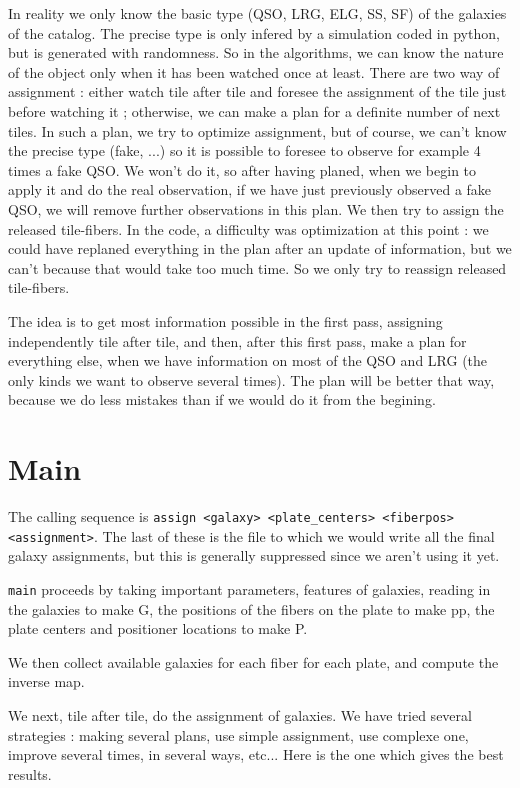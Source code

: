 \documentclass[10pt]{extarticle}
\begin{document}
\begin{multicols}{2}
In reality we only know the basic type (QSO, LRG, ELG, SS, SF) of the galaxies of the catalog. The precise type is only infered by a simulation coded in python, but is generated with randomness. So in the algorithms, we can know the nature of the object only when it has been watched once at least.
There are two way of assignment : either watch tile after tile and foresee the assignment of the tile just before watching it ; otherwise, we can make a plan for a definite number of next tiles. In such a plan, we try to optimize assignment, but of course, we can't know the precise type (fake, ...) so it is possible to foresee to observe for example 4 times a fake QSO. We won't do it, so after having planed, when we begin to apply it and do the real observation, if we have just previously observed a fake QSO, we will remove further observations in this plan. We then try to assign the released tile-fibers. In the code, a difficulty was optimization at this point : we could have replaned everything in the plan after an update of information, but we can't because that would take too much time. So we only try to reassign released tile-fibers.

The idea is to get most information possible in the first pass, assigning independently tile after tile, and then, after this first pass, make a plan for everything else, when we have information on most of the QSO and LRG (the only kinds we want to observe several times). The plan will be better that way, because we do less mistakes than if we would do it from the begining.


\section{Main}
 The calling sequence is {\tt assign  <galaxy> <plate\_centers> <fiberpos> <assignment>}. The last of these is the file to which we would write all the final galaxy assignments, but this is generally suppressed since we aren't using it yet.
 

 {\tt main} proceeds by taking important parameters, features of galaxies, reading in the galaxies to make G, the positions of the fibers on the plate to make pp, the plate centers and positioner locations to make P. 
 
We then collect available galaxies for each fiber for each plate, and compute the inverse map.
 
We next, tile after tile, do the assignment of galaxies. We have tried several strategies : making several plans, use simple assignment, use complexe one, improve several times, in several ways, etc... Here is the one which gives the best results.



\end{multicols}
\end{document}
